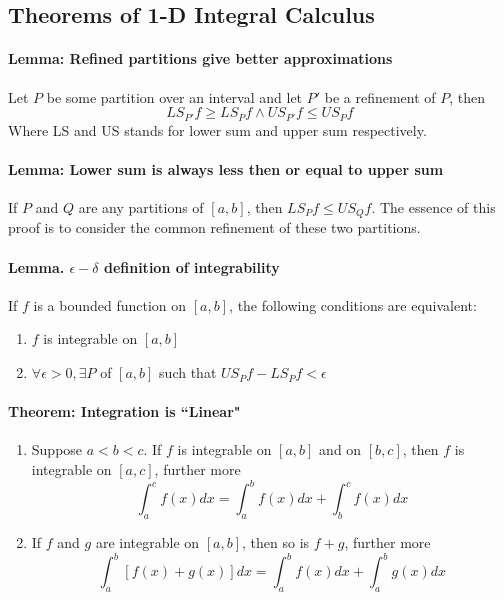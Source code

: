 \documentclass[11pt]{article}
\begin{document}
\subsection{Theorems of 1-D Integral Calculus}
\paragraph{Lemma: Refined partitions give better approximations} Let $P$ be some partition over an interval and let $P'$ be a refinement of $P$, then
\begin{equation*}
    LS_{P'}f \geq LS_{P}f \wedge US_{P'}f \leq US_{P}f
\end{equation*}
Where LS and US stands for lower sum and upper sum respectively.

\paragraph{Lemma: Lower sum is always less then or equal to upper sum} If $P$ and $Q$ are any partitions of $[a,b]$, then $LS_Pf \leq US_Qf$. The essence of this proof is to consider the common refinement of these two partitions.

\paragraph{Lemma. $\epsilon-\delta$ definition of integrability} If $f$ is a bounded function on $[a,b]$, the following conditions are equivalent:
\begin{enumerate}
    \item $f$ is integrable on $[a,b]$
    \item $\forall \epsilon > 0, \exists P$ of $[a,b]$ such that $US_Pf - LS_Pf < \epsilon$
\end{enumerate}

\paragraph{Theorem:  Integration is ``Linear"}
\begin{enumerate}
    \item Suppose $a < b<c$. If $f$ is integrable on $[a,b]$ and on $[b,c]$, then $f$ is integrable on $[a,c]$, further more
    \begin{equation*}
        \int_a^c f(x)dx = \int_a^b f(x)dx + \int_b^c f(x)dx
    \end{equation*}
    \item If $f$ and $g$ are integrable on $[a,b]$, then so is $f+g$, further more
    \begin{equation*}
        \int_a^b [f(x) + g(x)]dx = \int_a^b f(x)dx + \int_a^b g(x)dx
    \end{equation*}
\end{enumerate}
\end{document}
